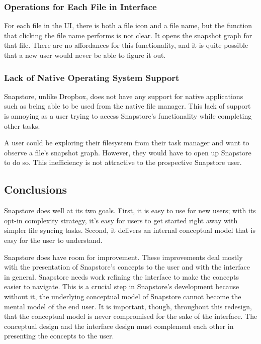 \subsubsection{Operations for Each File in Interface}

For each file in the UI, there is both a file icon and a file name, but the function that clicking the file name performs is not clear. It opens the snapshot graph for that file. There are no affordances for this functionality, and it is quite possible that a new user would never be able to figure it out.

\subsubsection{Lack of Native Operating System Support}

Snapstore, unlike Dropbox, does not have any support for native applications such as being able to be used from the native file manager. This lack of support is annoying as a user trying to access Snapstore's functionality while completing other tasks. 

A user could be exploring their filesystem from their task manager and want to observe a file's snapshot graph. However, they would have to open up Snapstore to do so. This inefficiency is not attractive to the prospective Snapstore user.

\subsection{Conclusions}

Snapstore does well at its two goals. First, it is easy to use for new users; with its opt-in complexity strategy, it's easy for users to get started right away with simpler file syncing tasks. Second, it delivers an internal conceptual model that is easy for the user to understand.

Snapstore does have room for improvement. These improvements deal mostly with the presentation of Snapstore's concepts to the user and with the interface in general. Snapstore needs work refining the interface to make the concepts easier to navigate. This is a crucial step in Snapstore's development because without it, the underlying conceptual model of Snapstore cannot become the mental model of the end user. It is important, though, throughout this redesign, that the conceptual model is never compromised for the sake of the interface. The conceptual design and the interface design must complement each other in presenting the concepts to the user.



